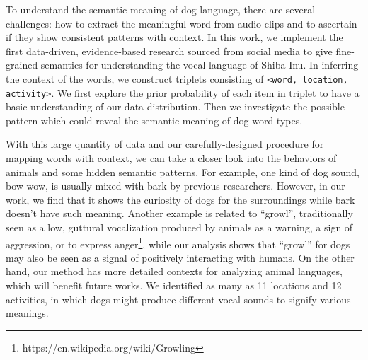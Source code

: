 To understand the semantic meaning of dog language, there are several challenges: how to extract the meaningful word from audio clips and to ascertain if they show consistent patterns with context. 
In this work, we implement the first data-driven, evidence-based research 
sourced from social media to give fine-grained semantics for understanding 
the vocal language of Shiba Inu.
In inferring the context of the words, we construct triplets consisting of \texttt{<word, location, activity>}. We first explore the prior probability of each item in triplet to have a basic understanding of our data distribution. Then we investigate the possible pattern which could reveal the semantic meaning of dog word types. 

With this large quantity of data and our carefully-designed procedure for mapping words with context, we can take a closer look into the behaviors of animals and some hidden semantic patterns. For example, one kind of dog sound, bow-wow, is usually mixed with bark by previous researchers. However, in our work, we find that it shows the curiosity of dogs for the surroundings while bark doesn't have such meaning. Another example is related to ``growl'', traditionally seen as a low, guttural vocalization produced by animals as a warning, a sign of aggression, or to express anger\footnote{https://en.wikipedia.org/wiki/Growling}, while our analysis shows that ``growl'' for dogs may also be seen as a signal of positively interacting with humans. 
On the other hand, our method has more detailed contexts for analyzing animal languages, which will benefit future works. We identified as many as 11 locations and 12 activities, in which dogs might produce different vocal sounds to signify various meanings. 
 



